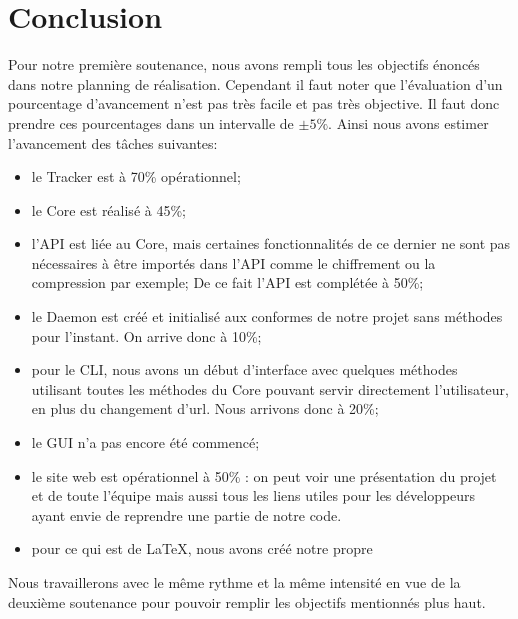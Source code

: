 \documentclass[11pt, a4paper]{report}
\begin{document}
    \section{Conclusion}
    Pour notre première soutenance, nous avons rempli tous les objectifs énoncés dans notre planning de réalisation. Cependant il faut noter que l'évaluation d'un pourcentage d'avancement n'est pas très facile et pas très objective. Il faut donc prendre ces pourcentages dans un intervalle de $\pm5\%$.\newline
    Ainsi nous avons estimer l'avancement des tâches suivantes:
    \begin{itemize}
      \item le Tracker est à 70\% opérationnel;
      \item le Core est réalisé à 45\%;
      \item l'API est liée au Core, mais certaines fonctionnalités de ce dernier ne sont pas nécessaires à être importés dans l'API comme le chiffrement ou la compression par exemple; De ce fait l'API est complétée à 50\%;
      \item le Daemon est créé et initialisé aux conformes de notre projet sans méthodes pour l'instant. On arrive donc à 10\%;
      \item pour le CLI, nous avons un début d'interface avec quelques méthodes utilisant toutes les méthodes du Core pouvant servir directement l'utilisateur, en plus du changement d'url. Nous arrivons donc à 20\%;
      \item le GUI n'a pas encore été commencé;
      \item le site web est opérationnel à 50\% : on peut voir une présentation du projet et de toute l'équipe mais aussi tous les liens utiles pour les développeurs ayant envie de reprendre une partie de notre code.
      \item pour ce qui est de \LaTeX, nous avons créé notre propre 
    \end{itemize}
    Nous travaillerons avec le même rythme et la même intensité en vue de la deuxième soutenance pour pouvoir remplir les objectifs mentionnés plus haut. 
\end{document}
